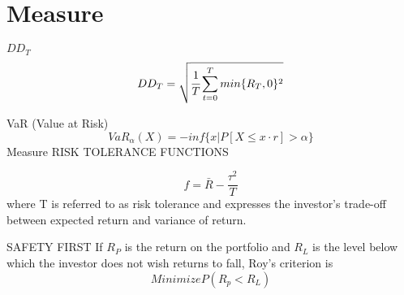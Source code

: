\section{Measure}
\(DD_T\)\cite{moody2001learning}
\[
DD_T = \sqrt{\cfrac{1}{T}\sum_{t=0}^{T}{min\{R_T,0\}^2}}
\]

VaR (Value at Risk)\cite{CoherentMeasuresofRisk}
\[
VaR_\alpha(X) = -inf \{x |P[X\leq x\cdot r]>\alpha \}
\]
Measure
RISK TOLERANCE FUNCTIONS\cite{elton2009modern}

\[f=\bar{R}-\frac{\tau^2}{T} \]
where T is referred to as risk tolerance and expresses the investor’s trade-off between
expected return and variance of return. 
\par
SAFETY FIRST\cite{elton2009modern}
If \(R_P\) is the return on the portfolio and \(R_L\) is the level below which the investor does not wish returns
to fall, Roy’s criterion is
\[Minimize P(R_p<R_L) \]